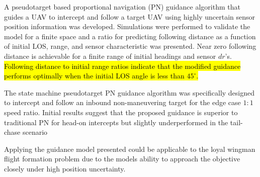 \documentclass[conference]{IEEEtran}
\begin{document}
A pseudotarget based proportional navigation (PN) guidance algorithm that guides a UAV to intercept and follow a target UAV using highly uncertain sensor position information was developed. Simulations were performed to validate the model for a finite space and a ratio for predicting following distance as a function of initial LOS, range, and sensor characteristic was presented. Near zero following distance is achievable for a finite range of initial headings and sensor $dr$'s. \hl{Following distance to initial range ratios indicate that the modified guidance performs optimally when the initial LOS angle is less than $45^\circ$. }

 The state machine pseudotarget PN guidance algorithm was specifically designed to intercept and follow an inbound non-maneuvering target for the edge case $1:1$ speed ratio. Initial results suggest that the proposed guidance is superior to traditional PN for head-on intercepts but slightly underperformed in the tail-chase scenario 

Applying the guidance model presented could be applicable to the loyal wingman flight formation problem due to the models ability to approach the objective closely under high position uncertainty. 





\end{document}
